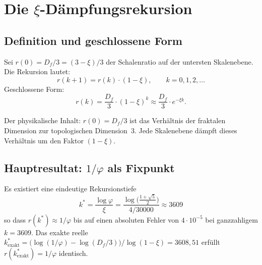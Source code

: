 \section{Die $\xi$-Dämpfungsrekursion}

\subsection{Definition und geschlossene Form}

\begin{definition}[$\xi$-Dämpfungsrekursion]\label{def:rek275}
Sei $r(0) = D_f/3 = (3-\xi)/3$ der Schalenratio auf der untersten Skalenebene.
Die Rekursion lautet:
\begin{equation}
  r(k+1) = r(k)\cdot(1-\xi), \qquad k = 0,1,2,\ldots
  \label{eq:rek275}
\end{equation}
Geschlossene Form:
\begin{equation}
  r(k) = \frac{D_f}{3}\cdot(1-\xi)^k \approx \frac{D_f}{3}\cdot e^{-\xi k}.
  \label{eq:closed275}
\end{equation}
\end{definition}

Der physikalische Inhalt: $r(0) = D_f/3$ ist das Verhältnis der fraktalen
Dimension zur topologischen Dimension~3. Jede Skalenebene dämpft dieses
Verhältnis um den Faktor $(1-\xi)$.

\subsection{Hauptresultat: $1/\varphi$ als Fixpunkt}

\begin{theorem}\label{satz:fixpunkt275}
Es existiert eine eindeutige Rekursionstiefe
\begin{equation}
  \boxed{k^* = \frac{\log\varphi}{\xi}
      = \frac{\log\!\bigl(\tfrac{1+\sqrt{5}}{2}\bigr)}{4/30000}
      \approx 3609}
  \label{eq:kstar275}
\end{equation}
so dass $r(k^*) \approx 1/\varphi$ bis auf einen absoluten Fehler von $4{\cdot}10^{-5}$ bei ganzzahligem $k=3609$. Das exakte reelle $k^*_\mathrm{exakt} = \bigl(\log(1/\varphi)-\log(D_f/3)\bigr)/\log(1-\xi) = 3608{,}51$ erfüllt $r(k^*_\mathrm{exakt}) = 1/\varphi$ identisch.
\end{theorem}

